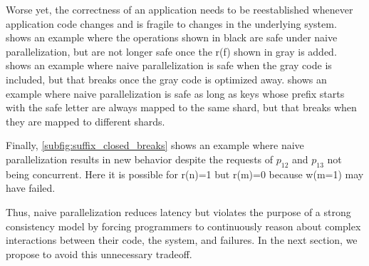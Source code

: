 Worse yet, the correctness of an application needs to be reestablished whenever application code changes and is fragile to changes in the underlying system.  shows an example where the operations shown in black are safe under naive parallelization, but are not longer safe once the r(f) shown in gray is added.  shows an example where naive parallelization is safe when the gray code is included, but that breaks once the gray code is optimized away.  shows an example where naive parallelization is safe as long as keys whose prefix starts with the safe letter are always mapped to the same shard, but that breaks when they are mapped to different shards.

Finally, \cref{subfig:suffix_closed_breaks} shows an example where naive parallelization results in new behavior despite the requests of $p_{12}$ and $p_{13}$ not being concurrent. Here it is possible for r(n)=1 but r(m)=0 because w(m=1) may have failed.

Thus, naive parallelization reduces latency but violates the purpose of a strong consistency model by forcing programmers to continuously reason about complex interactions between their code, the system, and failures. In the next section, we propose \mdl{} to avoid this unnecessary tradeoff.


